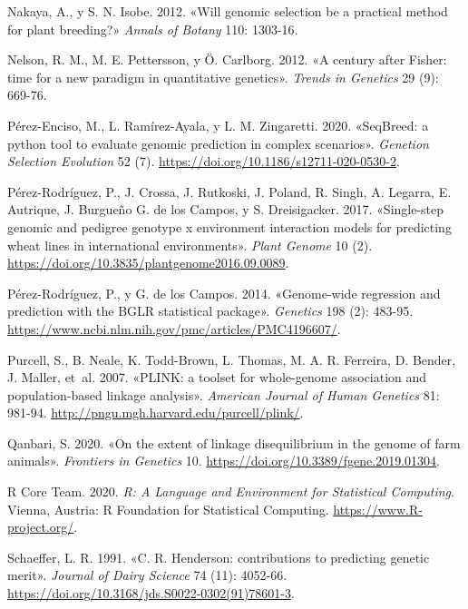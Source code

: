 \documentclass[11pt,spanish,a4paper,oneside,]{book} %
\begin{document}
\leavevmode\hypertarget{ref-cite:6}{}%
Nakaya, A., y S. N. Isobe. 2012. «Will genomic selection be a practical method for plant breeding?» \emph{Annals of Botany} 110: 1303-16.

\leavevmode\hypertarget{ref-cite:2}{}%
Nelson, R. M., M. E. Pettersson, y Ö. Carlborg. 2012. «A century after Fisher: time for a new paradigm in quantitative genetics». \emph{Trends in Genetics} 29 (9): 669-76.

\leavevmode\hypertarget{ref-cite:47}{}%
Pérez-Enciso, M., L. Ramírez-Ayala, y L. M. Zingaretti. 2020. «SeqBreed: a python tool to evaluate genomic prediction in complex scenarios». \emph{Genetion Selection Evolution} 52 (7). \url{https://doi.org/10.1186/s12711-020-0530-2}.

\leavevmode\hypertarget{ref-cite:19}{}%
Pérez-Rodríguez, P., J. Crossa, J. Rutkoski, J. Poland, R. Singh, A. Legarra, E. Autrique, J. Burgueño G. de los Campos, y S. Dreisigacker. 2017. «Single-step genomic and pedigree genotype x environment interaction models for predicting wheat lines in international environments». \emph{Plant Genome} 10 (2). \url{https://doi.org/10.3835/plantgenome2016.09.0089}.

\leavevmode\hypertarget{ref-cite:50}{}%
Pérez-Rodríguez, P., y G. de los Campos. 2014. «Genome-wide regression and prediction with the BGLR statistical package». \emph{Genetics} 198 (2): 483-95. \url{https://www.ncbi.nlm.nih.gov/pmc/articles/PMC4196607/}.

\leavevmode\hypertarget{ref-cite:49}{}%
Purcell, S., B. Neale, K. Todd-Brown, L. Thomas, M. A. R. Ferreira, D. Bender, J. Maller, et~al. 2007. «PLINK: a toolset for whole-genome association and population-based linkage analysis». \emph{American Journal of Human Genetics} 81: 981-94. \url{http://pngu.mgh.harvard.edu/purcell/plink/}.

\leavevmode\hypertarget{ref-cite:36}{}%
Qanbari, S. 2020. «On the extent of linkage disequilibrium in the genome of farm animals». \emph{Frontiers in Genetics} 10. \url{https://doi.org/10.3389/fgene.2019.01304}.

\leavevmode\hypertarget{ref-cite:52}{}%
R Core Team. 2020. \emph{R: A Language and Environment for Statistical Computing}. Vienna, Austria: R Foundation for Statistical Computing. \url{https://www.R-project.org/}.

\leavevmode\hypertarget{ref-cite:27}{}%
Schaeffer, L. R. 1991. «C. R. Henderson: contributions to predicting genetic merit». \emph{Journal of Dairy Science} 74 (11): 4052-66. \url{https://doi.org/10.3168/jds.S0022-0302(91)78601-3}.
\end{document}

